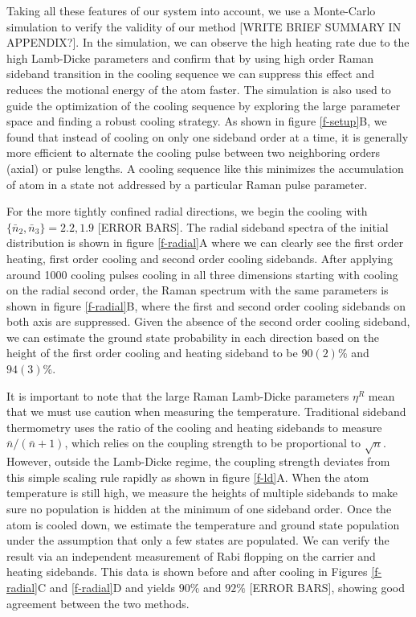 \documentclass[aps,prl,twocolumn,groupedaddress]{revtex4-1}
\begin{document}
Taking all these features of our system into account, we use a Monte-Carlo simulation to verify
the validity of our method [WRITE BRIEF SUMMARY IN APPENDIX?].
In the simulation, we can observe the high heating rate due to the high Lamb-Dicke parameters
and confirm that by using high order Raman sideband transition in the cooling sequence we can
suppress this effect and reduces the motional energy of the atom faster.
The simulation is also used to guide the optimization of the cooling sequence by exploring the
large parameter space and finding a robust cooling strategy. As shown in figure \ref{f-setup}B,
we found that instead of cooling on only one sideband order at a time, it is generally more
efficient to alternate the cooling pulse between two neighboring orders (axial) or pulse lengths.
A cooling sequence like this minimizes the accumulation of atom in a state not addressed by a
particular Raman pulse parameter.

For the more tightly confined radial directions,
we begin the cooling with $\{\bar n_2, \bar n_3\}=2.2, 1.9$ [ERROR BARS].
The radial sideband spectra of the initial distribution is shown in figure \ref{f-radial}A
where we can clearly see the first order heating, first order cooling and
second order cooling sidebands.
After applying around 1000 cooling pulses cooling in all three dimensions
starting with cooling on the radial second order,
the Raman spectrum with the same parameters is shown in figure \ref{f-radial}B,
where the first and second order cooling sidebands on both axis are suppressed.
Given the absence of the second order cooling sideband,
we can estimate the ground state probability in each direction based on the height of
the first order cooling and heating sideband to be $90(2)\%$ and $94(3)\%$.

It is important to note that the large Raman Lamb-Dicke parameters $\eta^R$ mean that we must use caution when measuring the temperature.
Traditional sideband thermometry uses
the ratio of the cooling and heating sidebands to measure $\bar n / (\bar n + 1)$, which relies
on the coupling strength to be proportional to $\sqrt{n}$. However, outside the
Lamb-Dicke regime, the coupling strength deviates from this simple scaling rule rapidly as
shown in figure \ref{f-ld}A.
When the atom temperature is still high,
we measure the heights of multiple sidebands to make sure no population is hidden at the
minimum of one sideband order. Once the atom is cooled down, we estimate the temperature
and ground state population under the assumption that only a few states are populated.
We can verify the result via an independent measurement of Rabi flopping on the carrier and heating
sidebands. This data is shown before and after cooling in Figures
\ref{f-radial}C and \ref{f-radial}D
and yields $90\%$ and $92\%$ [ERROR BARS],
showing good agreement between the two methods.
\end{document}
